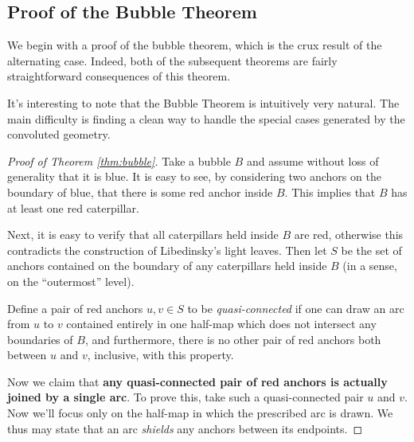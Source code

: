 \subsection{Proof of the Bubble Theorem}
We begin with a proof of the bubble theorem, which is the crux result of the alternating case.  Indeed, both of the subsequent theorems are fairly straightforward consequences of this theorem.

It's interesting to note that the Bubble Theorem is intuitively very natural.  The main difficulty is finding a clean way to handle the special cases generated by the convoluted geometry.

\begin{proof}[Proof of Theorem \ref{thm:bubble}]
	Take a bubble $B$ and assume without loss of generality that it is blue.  It is easy to see, by considering two anchors on the boundary of blue, that there is some red anchor inside $B$.  This implies that $B$ has at least one red caterpillar.

	Next, it is easy to verify that all caterpillars held inside $B$ are red, otherwise this contradicts the construction of Libedinsky's light leaves.  Then let $S$ be the set of anchors contained on the boundary of any caterpillars held inside $B$ (in a sense, on the ``outermost'' level).

	Define a pair of red anchors $u, v \in S$ to be \emph{quasi-connected} if one can draw an arc from $u$ to $v$ contained entirely in one half-map which does not intersect any boundaries of $B$, and furthermore, there is no other pair of red anchors both between $u$ and $v$, inclusive, with this property.

	Now we claim that \textbf{any quasi-connected pair of red anchors is actually joined by a single arc}.  To prove this, take such a quasi-connected pair $u$ and $v$.  Now we'll focus only on the half-map in which the prescribed arc is drawn.  We thus may state that an arc \emph{shields} any anchors between its endpoints.
	

\end{proof}
